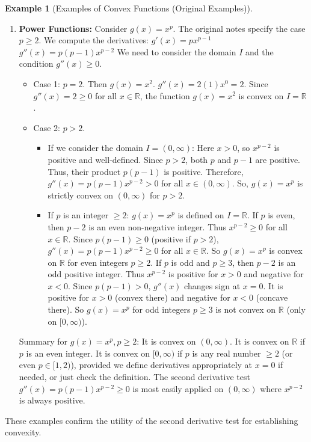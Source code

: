 \documentclass[11pt]{article}
\theoremstyle{definition}
\newtheorem{example}[theorem]{Example}
\theoremstyle{remark}
\begin{document}
\begin{example}[Examples of Convex Functions (Original Examples)]
\begin{enumerate}
    \item \textbf{Power Functions:} Consider $g(x) = x^p$. The original notes specify the case $p \ge 2$.
        We compute the derivatives:
        $g'(x) = px^{p-1}$
        $g''(x) = p(p-1)x^{p-2}$
        We need to consider the domain $I$ and the condition $g''(x) \ge 0$.
        \begin{itemize}
            \item Case 1: $p=2$. Then $g(x)=x^2$. $g''(x) = 2(1)x^0 = 2$. Since $g''(x) = 2 \ge 0$ for all $x \in \mathbb{R}$, the function $g(x)=x^2$ is convex on $I=\mathbb{R}$.
            \item Case 2: $p > 2$.
                \begin{itemize}
                    \item If we consider the domain $I = (0, \infty)$: Here $x > 0$, so $x^{p-2}$ is positive and well-defined. Since $p > 2$, both $p$ and $p-1$ are positive. Thus, their product $p(p-1)$ is positive. Therefore, $g''(x) = p(p-1)x^{p-2} > 0$ for all $x \in (0, \infty)$. So, $g(x) = x^p$ is strictly convex on $(0, \infty)$ for $p > 2$.
                    \item If $p$ is an integer $\ge 2$: $g(x)=x^p$ is defined on $I=\mathbb{R}$.
                        If $p$ is even, then $p-2$ is an even non-negative integer. Thus $x^{p-2} \ge 0$ for all $x \in \mathbb{R}$. Since $p(p-1) \ge 0$ (positive if $p>2$), $g''(x) = p(p-1)x^{p-2} \ge 0$ for all $x \in \mathbb{R}$. So $g(x)=x^p$ is convex on $\mathbb{R}$ for even integers $p \ge 2$.
                        If $p$ is odd and $p \ge 3$, then $p-2$ is an odd positive integer. Thus $x^{p-2}$ is positive for $x>0$ and negative for $x<0$. Since $p(p-1) > 0$, $g''(x)$ changes sign at $x=0$. It is positive for $x>0$ (convex there) and negative for $x<0$ (concave there). So $g(x)=x^p$ for odd integers $p \ge 3$ is not convex on $\mathbb{R}$ (only on $[0, \infty)$).
                \end{itemize}
        \end{itemize}
        Summary for $g(x)=x^p, p \ge 2$: It is convex on $(0, \infty)$. It is convex on $\mathbb{R}$ if $p$ is an even integer. It is convex on $[0, \infty)$ if $p$ is any real number $\ge 2$ (or even $p \in [1, 2)$), provided we define derivatives appropriately at $x=0$ if needed, or just check the definition. The second derivative test $g''(x) = p(p-1)x^{p-2} \ge 0$ is most easily applied on $(0, \infty)$ where $x^{p-2}$ is always positive.
\end{enumerate}
These examples confirm the utility of the second derivative test for establishing convexity.
\end{example}
\end{document}
